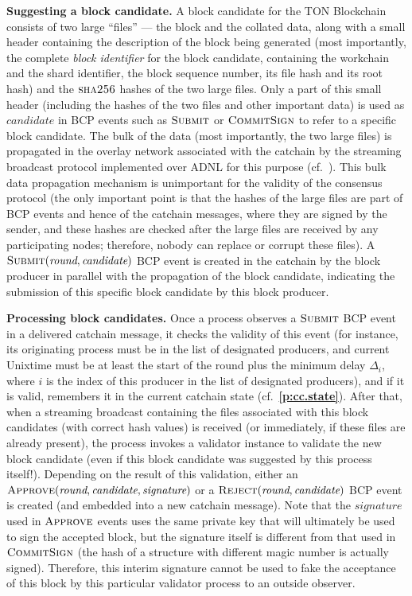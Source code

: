 \documentclass[12pt,oneside]{article}
\def\makepoint#1{\medbreak\noindent{\bf #1.\ }}
\def\nxsubpoint{\refstepcounter{subsubsection}%
  \smallbreak\makepoint{\thesubsubsection}}
\def\refpoint#1{{\rm\textbf{\ref{#1}}}}
\let\ptref=\refpoint
\def\emb#1{\textbf{#1.}}
\let\vr=\textit
\def\opsc#1{\operatorname{\textsc{#1}}}
\def\Sha{\opsc{sha256}}
\def\Submit{\opsc{Submit}}
\def\Approve{\opsc{Approve}}
\def\Reject{\opsc{Reject}}
\def\CommitSign{\opsc{CommitSign}}
\def\wround{\vr{round}}
\def\wcandidate{\vr{candidate}}
\def\wsignature{\vr{signature}}
\begin{document}
\nxsubpoint\emb{Suggesting a block candidate}
A block candidate for the TON Block\-chain consists of two large ``files'' --- the block and the collated data, along with a small header containing the description of the block being generated (most importantly, the complete {\em block identifier\/} for the block candidate, containing the workchain and the shard identifier, the block sequence number, its file hash and its root hash) and the $\Sha$ hashes of the two large files. Only a part of this small header (including the hashes of the two files and other important data) is used as $\wcandidate$ in BCP events such as $\Submit$ or $\CommitSign$ to refer to a specific block candidate. The bulk of the data (most importantly, the two large files) is propagated in the overlay network associated with the catchain by the streaming broadcast protocol implemented over ADNL for this purpose (cf.~\cite[5]{TON}). This bulk data propagation mechanism is unimportant for the validity of the consensus protocol (the only important point is that the hashes of the large files are part of BCP events and hence of the catchain messages, where they are signed by the sender, and these hashes are checked after the large files are received by any participating nodes; therefore, nobody can replace or corrupt these files). A $\Submit(\wround,\wcandidate)$ BCP event is created in the catchain by the block producer in parallel with the propagation of the block candidate, indicating the submission of this specific block candidate by this block producer.

\nxsubpoint\emb{Processing block candidates}
Once a process observes a $\Submit$ BCP event in a delivered catchain message, it checks the validity of this event (for instance, its originating process must be in the list of designated producers, and current Unixtime must be at least the start of the round plus the minimum delay $\Delta_i$, where $i$ is the index of this producer in the list of designated producers), and if it is valid, remembers it in the current catchain state (cf.~\ptref{p:cc.state}). After that, when a streaming broadcast containing the files associated with this block candidates (with correct hash values) is received (or immediately, if these files are already present), the process invokes a validator instance to validate the new block candidate (even if this block candidate was suggested by this process itself!). Depending on the result of this validation, either an $\Approve(\wround,\wcandidate,\wsignature)$ or a $\Reject(\wround,\wcandidate)$ BCP event is created (and embedded into a new catchain message). Note that the $\wsignature$ used in $\Approve$ events uses the same private key that will ultimately be used to sign the accepted block, but the signature itself is different from that used in $\CommitSign$ (the hash of a structure with different magic number is actually signed). Therefore, this interim signature cannot be used to fake the acceptance of this block by this particular validator process to an outside observer.
\end{document}
